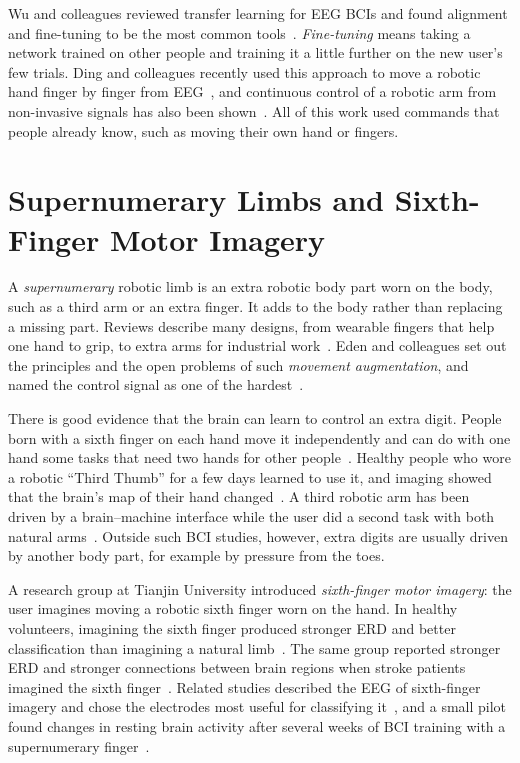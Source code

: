Wu and colleagues reviewed transfer learning for EEG BCIs and found alignment and
fine-tuning to be the most common tools~\cite{wu2022review}. \emph{Fine-tuning} means taking a
network trained on other people and training it a little further on the new user's few
trials. Ding and colleagues recently used this approach to move a robotic hand finger by
finger from EEG~\cite{ding2025}, and continuous control of a robotic arm from non-invasive
signals has also been shown~\cite{edelman2019}. All of this work used commands that people
already know, such as moving their own hand or fingers.

\section{Supernumerary Limbs and Sixth-Finger Motor Imagery}\label{sec:lit-sixth}

A \emph{supernumerary} robotic limb is an extra robotic body part worn on the body, such as a
third arm or an extra finger. It adds to the body rather than replacing a missing part.
Reviews describe many designs, from wearable fingers that help one hand to grip, to extra
arms for industrial work~\cite{prattichizzo2021,tong2021}. Eden and colleagues set out the
principles and the open problems of such \emph{movement augmentation}, and named the control
signal as one of the hardest~\cite{eden2022}.

There is good evidence that the brain can learn to control an extra digit. People born with
a sixth finger on each hand move it independently and can do with one hand some tasks that
need two hands for other people~\cite{mehring2019}. Healthy people who wore a robotic ``Third
Thumb'' for a few days learned to use it, and imaging showed that the brain's map of their
hand changed~\cite{kieliba2021}. A third robotic arm has been driven by a brain--machine
interface while the user did a second task with both natural arms~\cite{penaloza2018}.
Outside such BCI studies, however, extra digits are usually driven by another body part,
for example by pressure from the toes.

A research group at Tianjin University introduced \emph{sixth-finger motor imagery}: the
user imagines moving a robotic sixth finger worn on the hand. In healthy volunteers,
imagining the sixth finger produced stronger ERD and better classification than imagining a
natural limb~\cite{wang2024jbhi}. The same group reported stronger ERD and stronger
connections between brain regions when stroke patients imagined the sixth
finger~\cite{wang2024tnsre}. Related studies described the EEG of sixth-finger imagery and
chose the electrodes most useful for classifying it~\cite{liu2022jne}, and a small pilot
found changes in resting brain activity after several weeks of BCI training with a
supernumerary finger~\cite{liu2022frontiers}.


